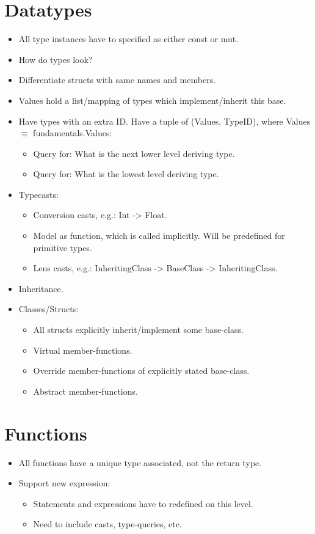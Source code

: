 \section{Datatypes}
\begin{itemize}
  \item All type instances have to specified as either const or mut.
  \item How do types look?
  \item Differentiate structs with same names and members.
  \item Values hold a list/mapping of types which implement/inherit this base.
  \item Have types with an extra ID. Have a tuple of (Values, TypeID), where Values $\equiv$ fundamentals.Values:
    \begin{itemize}
      \item Query for: What is the next lower level deriving type.
      \item Query for: What is the lowest level deriving type.
    \end{itemize}
  \item Typecasts:
    \begin{itemize}
      \item Conversion casts, e.g.: Int -> Float.
      \item Model as function, which is called implicitly. Will be predefined for primitive types.
      \item Lens casts, e.g.: InheritingClass -> BaseClass -> InheritingClass.
    \end{itemize}
  \item Inheritance.
  \item Classes/Structs:
  \begin{itemize}
    \item All structs explicitly inherit/implement some base-class.
    \item Virtual member-functions.
    \item Override member-functions of explicitly stated base-class.
    \item Abstract member-functions.
  \end{itemize}
\end{itemize}

\section{Functions}
\begin{itemize}
  \item All functions have a unique type associated, not the return type.
  \item Support new expression:
    \begin{itemize}
      \item Statements and expressions have to redefined on this level.
      \item Need to include casts, type-queries, etc.
    \end{itemize}
\end{itemize}

